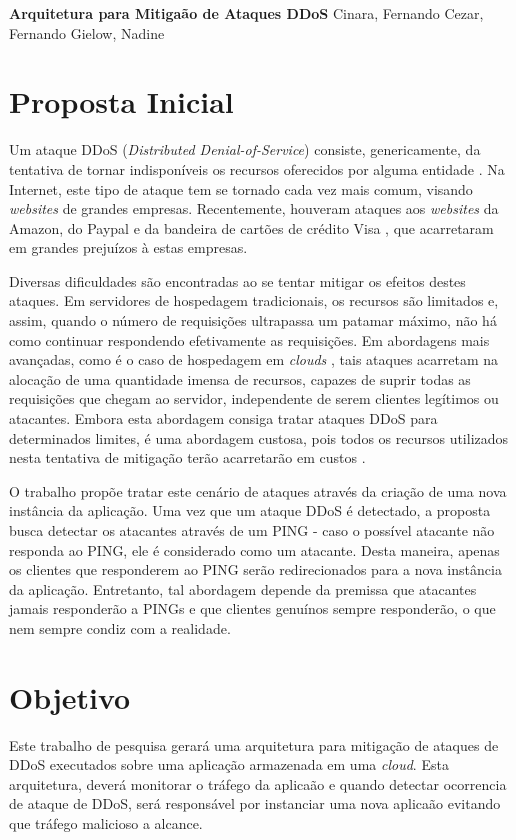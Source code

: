 \documentclass[a4paper, 11pt]{article}
\begin{document}
{
\begin{center}
{\LARGE \textbf{Arquitetura para Mitiga\cc\~ao de Ataques DDoS}}
\vskip 0.5cm
{\Large Cinara, Fernando Cezar, Fernando Gielow, Nadine}
\end{center}
}

\section{Proposta Inicial}

Um ataque DDoS (\emph{Distributed Denial-of-Service})
 consiste, genericamente, da tentativa de tornar indisponíveis
os recursos oferecidos por alguma entidade \cite{Zhang:11}. Na Internet, este
tipo de ataque tem se tornado cada vez mais comum, visando \emph{websites} de
grandes empresas. Recentemente, houveram ataques aos \emph{websites} da Amazon,
do Paypal e da bandeira de cartões de crédito Visa \cite{Zuckerman:10}, que
acarretaram em grandes prejuízos à estas empresas.

Diversas dificuldades são encontradas ao se tentar mitigar os efeitos destes
ataques. Em servidores de hospedagem tradicionais, os recursos são limitados e,
assim, quando o número de requisições ultrapassa um patamar máximo, não há como
continuar respondendo efetivamente as requisições. Em abordagens mais avançadas,
como é o caso de hospedagem em \emph{clouds} \cite{Zhang:10}, tais ataques
acarretam na alocação de uma quantidade imensa de recursos, capazes de
suprir todas as requisições que chegam ao servidor, independente de serem
clientes legítimos ou atacantes. Embora esta abordagem consiga tratar ataques
DDoS para determinados limites, é uma abordagem custosa, pois todos os recursos
utilizados nesta tentativa de mitigação ter\~ao acarretar\~ao em custos
\cite{Soon:10}.

O trabalho \cite{Bakshi:10} prop\~oe tratar este cen\'ario de ataques através da
criação de uma nova instância da aplicação. Uma vez que um ataque DDoS é
detectado, a proposta busca detectar os atacantes através de um PING -
caso o possível atacante não responda ao PING, ele é considerado como um
atacante. Desta maneira, apenas os clientes que responderem ao PING serão
redirecionados para a nova instância da aplicação. Entretanto, tal abordagem
depende da premissa que atacantes jamais responderão a PINGs e que clientes
genuínos sempre responderão, o que nem sempre condiz com a realidade. 

\section{Objetivo}
Este trabalho de pesquisa gerar\'a uma arquitetura para mitigação de ataques de
DDoS executados sobre uma aplicação armazenada em uma \emph{cloud}. Esta
arquitetura, dever\'a monitorar o tr\'afego da aplica\cc\~ao e quando detectar
ocorrencia de ataque de DDoS, ser\'a respons\'avel por instanciar uma nova
aplica\cc\~ao evitando que tr\'afego malicioso a alcance.
\end{document}

